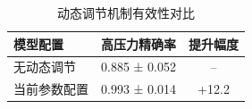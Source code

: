 
\begin{table}[htbp]
\centering
\caption{动态调节机制有效性对比}
\label{tab:parameter_validation}
\begin{tabular}{lcc}
\toprule
模型配置 & 高压力精确率 & 提升幅度 \\
\midrule
无动态调节 & 0.885 ± 0.052 & -- \\
当前参数配置 & 0.993 ± 0.014 & +12.2%
\bottomrule
\end{tabular}
\end{table}

